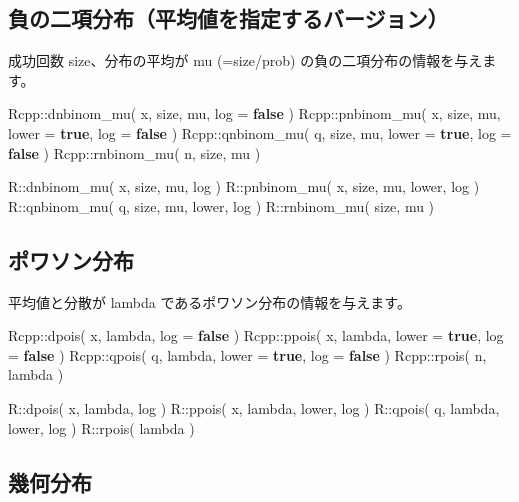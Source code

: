 \documentclass[]{book}
\newenvironment{Shaded}{\begin{snugshade}}{\end{snugshade}}
\newcommand{\KeywordTok}[1]{\textcolor[rgb]{0.13,0.29,0.53}{\textbf{#1}}}
\newcommand{\NormalTok}[1]{#1}
\begin{document}
\subsection{負の二項分布（平均値を指定するバージョン）}

成功回数 size、分布の平均が mu (=size/prob) の負の二項分布の情報を与えます。

\begin{Shaded}
\begin{Highlighting}[]
\NormalTok{Rcpp::dnbinom_mu( x, size, mu,               log = }\KeywordTok{false}\NormalTok{ )}
\NormalTok{Rcpp::pnbinom_mu( x, size, mu, lower = }\KeywordTok{true}\NormalTok{, log = }\KeywordTok{false}\NormalTok{ )}
\NormalTok{Rcpp::qnbinom_mu( q, size, mu, lower = }\KeywordTok{true}\NormalTok{, log = }\KeywordTok{false}\NormalTok{ )}
\NormalTok{Rcpp::rnbinom_mu( n, size, mu )}

\NormalTok{R::dnbinom_mu( x, size, mu,        log )}
\NormalTok{R::pnbinom_mu( x, size, mu, lower, log )}
\NormalTok{R::qnbinom_mu( q, size, mu, lower, log )}
\NormalTok{R::rnbinom_mu(    size, mu )}
\end{Highlighting}
\end{Shaded}

\subsection{ポワソン分布}

平均値と分散が lambda であるポワソン分布の情報を与えます。

\begin{Shaded}
\begin{Highlighting}[]
\NormalTok{Rcpp::dpois( x, lambda,               log = }\KeywordTok{false}\NormalTok{ )}
\NormalTok{Rcpp::ppois( x, lambda, lower = }\KeywordTok{true}\NormalTok{, log = }\KeywordTok{false}\NormalTok{ )}
\NormalTok{Rcpp::qpois( q, lambda, lower = }\KeywordTok{true}\NormalTok{, log = }\KeywordTok{false}\NormalTok{ )}
\NormalTok{Rcpp::rpois( n, lambda )}

\NormalTok{R::dpois( x, lambda, log )}
\NormalTok{R::ppois( x, lambda, lower, log )}
\NormalTok{R::qpois( q, lambda, lower, log )}
\NormalTok{R::rpois(    lambda )}
\end{Highlighting}
\end{Shaded}

\subsection{幾何分布}
\end{document}
